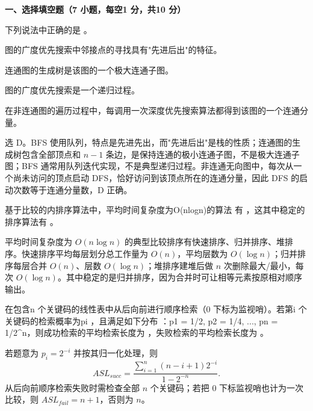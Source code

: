 

\textbf{一、选择填空题（7 小题，每空1 分，共10 分）}
\begin{question}
下列说法中正确的是 \blank。

\begin{choiceoptions}[1]
  \item 图的广度优先搜索中邻接点的寻找具有"先进后出"的特征。
  \item 连通图的生成树是该图的一个极大连通子图。
  \item 图的广度优先搜索是一个递归过程。
  \item 在非连通图的遍历过程中，每调用一次深度优先搜索算法都得到该图的一个连通分量。
\end{choiceoptions}

\begin{solution}
选 D。BFS 使用队列，特点是先进先出，而"先进后出"是栈的性质；连通图的生成树包含全部顶点和 $n-1$ 条边，是保持连通的极小连通子图，不是极大连通子图；BFS 通常用队列迭代实现，不是典型递归过程。非连通无向图中，每次从一个尚未访问的顶点启动 DFS，恰好访问到该顶点所在的连通分量，因此 DFS 的启动次数等于连通分量数，D 正确。
\end{solution}
\end{question}

\begin{question}
基于比较的内排序算法中，平均时间复杂度为O(nlogn)的算法 有 \blank，这其中稳定的排序算法有 \blank。

\begin{solution}
平均时间复杂度为 $O(n\log n)$ 的典型比较排序有快速排序、归并排序、堆排序。快速排序平均每层划分总工作量为 $O(n)$，平均层数为 $O(\log n)$；归并排序每层合并 $O(n)$、层数 $O(\log n)$；堆排序建堆后做 $n$ 次删除最大/最小，每次 $O(\log n)$。其中稳定的是归并排序，因为合并时可让相等元素按原相对顺序输出。
\end{solution}
\end{question}

\begin{question}
在包含n 个关键码的线性表中从后向前进行顺序检索（0 下标为监视哨）。若第i 个关键码的检索概率为pi ，且满足如下分布 ：p1 = 1/2, p2 = 1/4,  ..., pn = 1/2\^{}n，则成功检索的平均检索长度为 \blank，失败检索的平均检索长度为 \blank。

\begin{solution}
若题意为 $p_i=2^{-i}$ 并按其归一化处理，则
  \[
  ASL_{succ}=\frac{\sum_{i=1}^n (n-i+1)2^{-i}}{1-2^{-n}}.
  \]
  从后向前顺序检索失败时需检查全部 $n$ 个关键码；若把 0 下标监视哨也计为一次比较，则 $ASL_{fail}=n+1$，否则为 $n$。
\end{solution}
\end{question}

